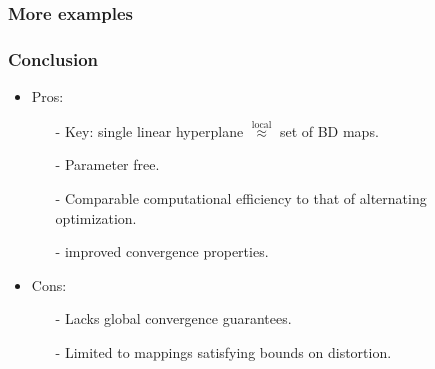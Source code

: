 \documentclass[serif,mathserif]{beamer}
\begin{document}
\begin{frame}
 \frametitle{More examples}
\end{frame}

\begin{frame}
 \frametitle{Conclusion}
 \begin{itemize}
  \item Pros:
    \begin{itemize}
      \item[-] Key: single linear hyperplane $\overset{\text{local}}{\approx}$ set of BD maps.
      \item[-] Parameter free.
      \item[-] Comparable computational efficiency to that of alternating optimization.
      \item[-] improved convergence properties. 
    \end{itemize}
  \item Cons:
    \begin{itemize}
      \item[-] Lacks global convergence guarantees.
      \item[-] Limited to mappings satisfying bounds on distortion.
  \end{itemize}
 \end{itemize}
\end{frame}

\begin{frame} 
\end{frame}
\end{document}
